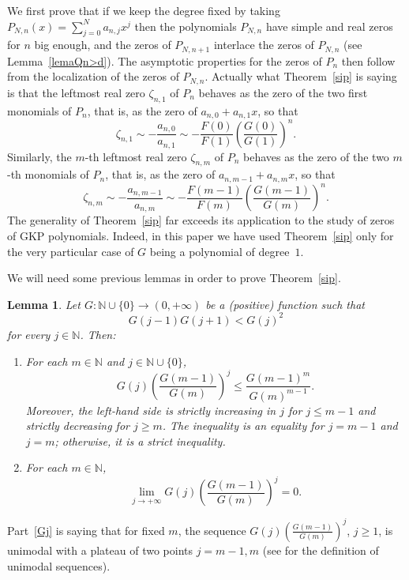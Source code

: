 \documentclass[10pt, a4paper, leqno]{amsart}
\numberwithin{equation}{section}
\theoremstyle{plain}
\newtheorem{Lem}[Theo]{Lemma}
\theoremstyle{remark}
\newcommand{\NN}{\mathbb{N}}
\begin{document}
We first prove that if we keep the degree fixed by taking $P_{N,n}(x)=\sum_{j=0}^Na_{n,j}x^j$ then the polynomials $P_{N,n}$ have simple and real zeros for $n$ big enough, and the zeros of $P_{N,n+1}$ interlace the zeros of $P_{N,n}$ (see Lemma~\ref{lemaQn>d}). The asymptotic properties for the zeros of $P_n$ then follow from the localization of the zeros of $P_{N,n}$. Actually what Theorem~\ref{sip} is saying is that the leftmost real zero $\zeta_{n,1}$ of $P_n$ behaves as the zero of the two first monomials of $P_n$, that is, as the zero of $a_{n,0}+a_{n,1}x$, so that
\[
  \zeta_{n,1}\sim -\frac{a_{n,0}}{a_{n,1}}\sim -\frac{F(0)}{F(1)}\left(\frac{G(0)}{G(1)}\right)^n.
\]
Similarly, the $m$-th leftmost real zero $\zeta_{n,m}$ of $P_n$ behaves as the zero of the two $m$-th monomials of $P_n$, that is, as the zero of $a_{n,m-1}+a_{n,m}x$, so that
\[
  \zeta_{n,m}\sim -\frac{a_{n,m-1}}{a_{n,m}}
  \sim -\frac{F(m-1)}{F(m)} \left(\frac{G(m-1)}{G(m)}\right)^n.
\]
The generality of Theorem~\ref{sip} far exceeds its application to the study of zeros of GKP polynomials. Indeed, in this paper we have used Theorem~\ref{sip} only for the very particular case of $G$ being a polynomial of degree~$1$.

We will need some previous lemmas in order to prove Theorem~\ref{sip}.

\begin{Lem}
\label{lemaG}
Let $G : \NN \cup \{0\} \to (0,+\infty)$ be a (positive) function such that
\[
  G(j-1) G(j+1) < G(j)^2
\]
for every $j \in \NN$. Then:
\begin{enumerate}
\item\label{Gj}
For each $m \in \NN$ and $j \in \NN \cup \{0\}$,
\[
  G(j) \left(\frac{G(m-1)}{G(m)}\right)^j
  \le \frac{G(m-1)^m}{G(m)^{m-1}}.
\]
Moreover, the left-hand side is strictly increasing in $j$ for $j \le m-1$ and strictly decreasing for $j \ge m$. The inequality is an equality for $j = m-1$ and $j = m$; otherwise, it is a strict inequality.

\item\label{limite0}
For each $m \in \NN$,
\[
  \lim_{j \to +\infty} G(j) \left(\frac{G(m-1)}{G(m)}\right)^j = 0.
\]
\end{enumerate}
\end{Lem}

Part~\eqref{Gj} is saying that for fixed $m$, the sequence $G(j) \left(\frac{G(m-1)}{G(m)}\right)^j$, $j\ge 1$, is unimodal with a plateau of two points $j=m-1,m$ (see \cite[Section 7.1]{Com} for the definition of unimodal sequences).
\end{document}
